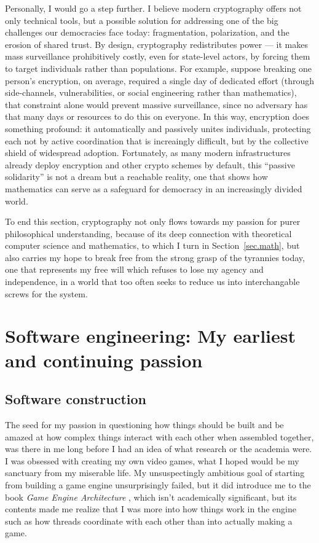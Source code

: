 \documentclass[10pt]{article}
\begin{document}
Personally, I would go a step further. I believe modern cryptography offers not
only technical tools, but a possible solution for addressing one of the big
challenges our democracies face today: fragmentation, polarization, and the
erosion of shared trust. By design, cryptography redistributes power --- it
makes mass surveillance prohibitively costly, even for state-level actors, by
forcing them to target individuals rather than populations. For example,
suppose breaking one person’s encryption, on average, required a single day of
dedicated effort (through side-channels, vulnerabilities, or social engineering
rather than mathematics), that constraint alone would prevent massive
surveillance, since no adversary has that many days or resources to do this on
everyone. In this way, encryption does something profound: it automatically and
passively unites individuals, protecting each not by active coordination that
is increaingly difficult, but by the collective shield of widespread adoption.
Fortunately, as many modern infrastructures already deploy encryption and other
crypto schemes by default, this ``passive solidarity'' is not a dream but a
reachable reality, one that shows how mathematics can serve as a safeguard for
democracy in an increasingly divided world.

To end this section, cryptography not only flows towards my passion for purer
philosophical understanding, because of its deep connection with theoretical
computer science and mathematics, to which I turn in Section~\ref{sec.math},
but also carries my hope to break free from the strong grasp of the tyrannies
today, one that represents my free will which refuses to lose my agency and
independence, in a world that too often seeks to reduce us into interchangable
screws for the system.  

\section[Software engineering]{
Software engineering: My earliest and continuing passion}
\subsection{Software construction}
The seed for my passion in questioning how things should be built and be amazed
at how complex things interact with each other when assembled together, was
there in me long before I had an idea of what research or the academia were. I
was obsessed with creating my own video games, what I hoped would be my
sanctuary from my miserable life. My unsuspectingly ambitious goal of starting
from building a game engine unsurprisingly failed, but it did introduce me to
the book \emph{Game Engine Architecture} \cite{game.engine.arch}, which isn't
academically significant, but its contents made me realize that I was more into
how things work in the engine such as how threads coordinate with each other
than into actually making a game.
\end{document}
